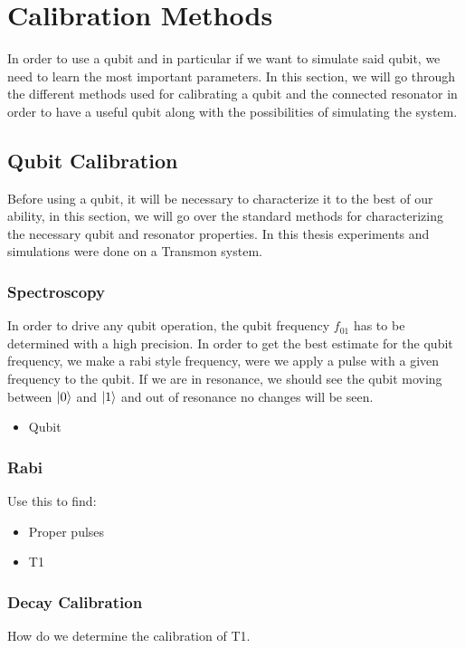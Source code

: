 \chapter{Calibration Methods}
In order to use a qubit and in particular if we want to simulate said qubit, we need to learn the most important parameters. In this section, we will go through the different methods used for calibrating a qubit and the connected resonator in order to have a useful qubit along with the possibilities of simulating the system.


\section{Qubit Calibration}
Before using a qubit, it will be necessary to characterize it to the best of our ability, in this section, we will go over the standard methods for characterizing the necessary qubit and resonator properties. In this thesis experiments and simulations were done on a Transmon system.

\subsection{Spectroscopy}
In order to drive any qubit operation, the qubit frequency $f_{01}$ has to be determined with a high precision. In order to get the best estimate for the qubit frequency, we make a rabi style frequency, were we apply a pulse with a given frequency to the qubit. If we are in resonance, we should see the qubit moving between $\ket{0}$ and $\ket{1}$ and out of resonance no changes will be seen.

\begin{itemize}
    \item Qubit 
\end{itemize}

\subsection{Rabi}

Use this to find:
\begin{itemize}
    \item Proper pulses
    \item T1
\end{itemize}


\subsection{Decay Calibration}
How do we determine the calibration of T1. 

